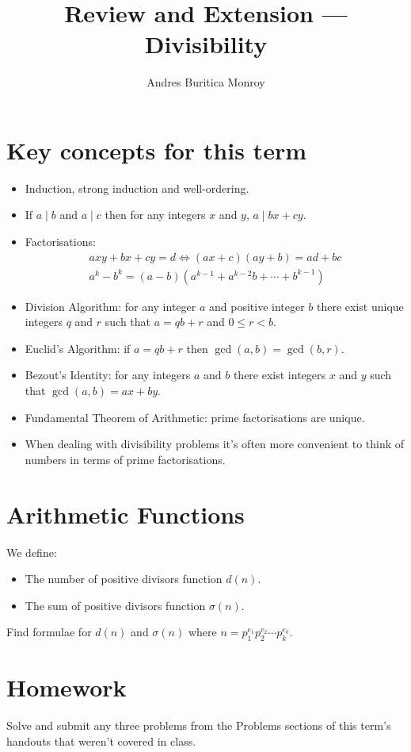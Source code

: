 \documentclass{article}
\title{Review and Extension --- Divisibility}
\author{Andres Buritica Monroy}
\date{}
\begin{document}
\maketitle
\section{Key concepts for this term}
\begin{itemize}
	\item Induction, strong induction and well-ordering.
	\item If $a\mid b$ and $a\mid c$ then for any integers $x$ and $y$, $a\mid
		      bx+cy$.
	\item Factorisations:
	      \begin{align*}
		      axy+bx+cy=d\iff (ax+c)(ay+b)=ad+bc \\
		      a^k-b^k=(a-b)\left(a^{k-1}+a^{k-2}b+\cdots+b^{k-1}\right)
	      \end{align*}
	\item Division Algorithm: for any integer $a$ and positive integer $b$ there
	      exist unique integers $q$ and $r$ such that $a=qb+r$ and $0\le r<b$.
	\item Euclid's Algorithm: if $a=qb+r$ then $\gcd(a,b)=\gcd(b,r)$.
	\item Bezout's Identity: for any integers $a$ and $b$ there exist integers
	      $x$ and $y$ such that $\gcd(a,b)=ax+by$.
	\item Fundamental Theorem of Arithmetic: prime factorisations are unique.
	\item When dealing with divisibility problems it's often more convenient to
	      think of numbers in terms of prime factorisations.
\end{itemize}
\section{Arithmetic Functions}
We define:
\begin{itemize}
	\item The number of positive divisors function $d(n)$.
	\item The sum of positive divisors function $\sigma(n)$.
\end{itemize}
Find formulae for $d(n)$ and $\sigma(n)$ where
$n=p_1^{e_1}p_2^{e_2}\cdots p_k^{e_k}$.
\section{Homework}
Solve and submit any three problems from the Problems sections of this
term's handouts that weren't covered in class.
\end{document}
